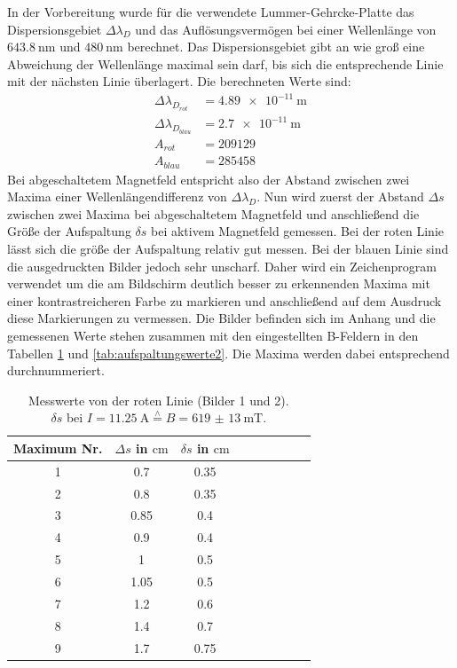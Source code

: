 \documentclass[
  bibliography=totoc,     %
  captions=tableheading,  %
  titlepage=firstiscover, %
]{scrartcl}
\begin{document}
\noindent
In der Vorbereitung wurde für die verwendete Lummer-Gehrcke-Platte das Dispersionsgebiet $\Delta\lambda_D$
und das Auflösungsvermögen bei einer Wellenlänge von $\SI{643.8}{\nano\meter}$ und
$\SI{480}{\nano\meter}$ berechnet. Das Dispersionsgebiet gibt an wie groß eine Abweichung
der Wellenlänge maximal sein darf, bis sich die entsprechende Linie mit der nächsten Linie überlagert.
Die berechneten Werte sind:
\begin{align*}
  \Delta\lambda_{D_{rot}} &= \SI{4.89e-11}{\meter} \\
  \Delta\lambda_{D_{blau}} &= \SI{2.7e-11}{\meter} \\
  A_{rot} &= 209129 \\
  A_{blau} &= 285458
\end{align*}
Bei abgeschaltetem Magnetfeld entspricht also der Abstand zwischen zwei Maxima einer
Wellenlängendifferenz von $\Delta\lambda_D$. Nun wird zuerst der Abstand $\Delta s$ zwischen
zwei Maxima bei abgeschaltetem Magnetfeld und anschließend die Größe
der Aufspaltung $\delta s$ bei aktivem Magnetfeld gemessen.
Bei der roten Linie lässt sich die größe der Aufspaltung relativ gut messen.
Bei der blauen Linie sind die ausgedruckten Bilder jedoch sehr unscharf. Daher
wird ein Zeichenprogram verwendet um die am Bildschirm deutlich besser zu erkennenden
Maxima mit einer kontrastreicheren Farbe zu markieren und anschließend auf dem Ausdruck
diese Markierungen zu vermessen.
\clearpage
\noindent
Die Bilder befinden sich im Anhang und die gemessenen Werte stehen zusammen mit den eingestellten
B-Feldern in den Tabellen \ref{tab:aufspaltungswerte1} und \ref{tab:aufspaltungswerte2}.
Die Maxima werden dabei entsprechend durchnummeriert.
\begin{table}[H]
  \centering
  \caption{Messwerte von der roten Linie (Bilder 1 und 2).\\ $\delta s$ bei $I=\SI{11.25}{\ampere}\stackrel{\wedge}{=}B=\SI{619(13)}{\milli\tesla}$.}
  \label{tab:aufspaltungswerte1}
  \begin{tabular}{c c c c c c c c c}
    \toprule
    Maximum Nr. & $\Delta s$ in $\si{\centi\meter}$ & $\delta s$ in $\si{\centi\meter}$ \\
    \midrule
     1 & 0.7  & 0.35 \\
     2 & 0.8  & 0.35 \\
     3 & 0.85 & 0.4  \\
     4 & 0.9  & 0.4  \\
     5 & 1    & 0.5  \\
     6 & 1.05 & 0.5  \\
     7 & 1.2  & 0.6  \\
     8 & 1.4  & 0.7  \\
     9 & 1.7  & 0.75 \\
    \bottomrule
  \end{tabular}
\end{table}
\end{document}
